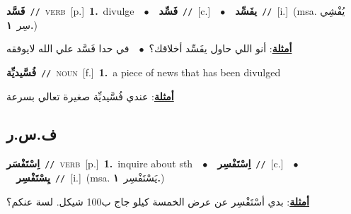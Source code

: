 \documentclass[10pt,a4paper,twoside]{article} %
\begin{document}
\begin{multicols}{2}
{\setlength\topsep{0pt}\textbf{\foreignlanguage{arabic}{فَسَّد}}\ {\color{gray}\texttt{//}\color{black}}\ \textsc{verb}\ [p.]\ \textbf{1.}~divulge\ \ $\bullet$\ \ \setlength\topsep{0pt}\textbf{\foreignlanguage{arabic}{فَسِّد}}\ {\color{gray}\texttt{//}\color{black}}\ [c.]\ \ $\bullet$\ \ \setlength\topsep{0pt}\textbf{\foreignlanguage{arabic}{يفَسِّد}}\ {\color{gray}\texttt{//}\color{black}}\ [i.]\ \color{gray}(msa. \foreignlanguage{arabic}{يُفْشِي سِر}~\foreignlanguage{arabic}{\textbf{١.}})\color{black}\  \begin{flushright}\color{gray}\foreignlanguage{arabic}{\textbf{\underline{\foreignlanguage{arabic}{أمثلة}}}: أنو اللي حاول يفَسِّد أخلاقك؟\ $\bullet$\ \  في حدا فَسَّد علي الله لايوفقه}\end{flushright}\color{black}} \vspace{2mm}

{\setlength\topsep{0pt}\textbf{\foreignlanguage{arabic}{فُسَّيديِّة}}\ {\color{gray}\texttt{//}\color{black}}\ \textsc{noun}\ [f.]\ \textbf{1.}~a piece of news that has been divulged\  \begin{flushright}\color{gray}\foreignlanguage{arabic}{\textbf{\underline{\foreignlanguage{arabic}{أمثلة}}}: عندي فُسَّيديِّة صغيرة تعالي بسرعة}\end{flushright}\color{black}} \vspace{2mm}

\vspace{-3mm}
\subsection*{\color{blue}\foreignlanguage{arabic}{ف.س.ر}\color{blue}{}} 

{\setlength\topsep{0pt}\textbf{\foreignlanguage{arabic}{اِسْتَفْسَر}}\ {\color{gray}\texttt{//}\color{black}}\ \textsc{verb}\ [p.]\ \textbf{1.}~inquire about sth\ \ $\bullet$\ \ \setlength\topsep{0pt}\textbf{\foreignlanguage{arabic}{اِسْتَفْسِر}}\ {\color{gray}\texttt{//}\color{black}}\ [c.]\ \ $\bullet$\ \ \setlength\topsep{0pt}\textbf{\foreignlanguage{arabic}{يِسْتَفْسِر}}\ {\color{gray}\texttt{//}\color{black}}\ [i.]\ \color{gray}(msa. \foreignlanguage{arabic}{يَسْتَفْسِر}~\foreignlanguage{arabic}{\textbf{١.}})\color{black}\  \begin{flushright}\color{gray}\foreignlanguage{arabic}{\textbf{\underline{\foreignlanguage{arabic}{أمثلة}}}: بدي أسْتَفْسِر عن عرض الخمسة كيلو جاج ب100 شيكل. لسة عنكم؟}\end{flushright}\color{black}} \vspace{2mm}


\end{multicols}
\end{document}
